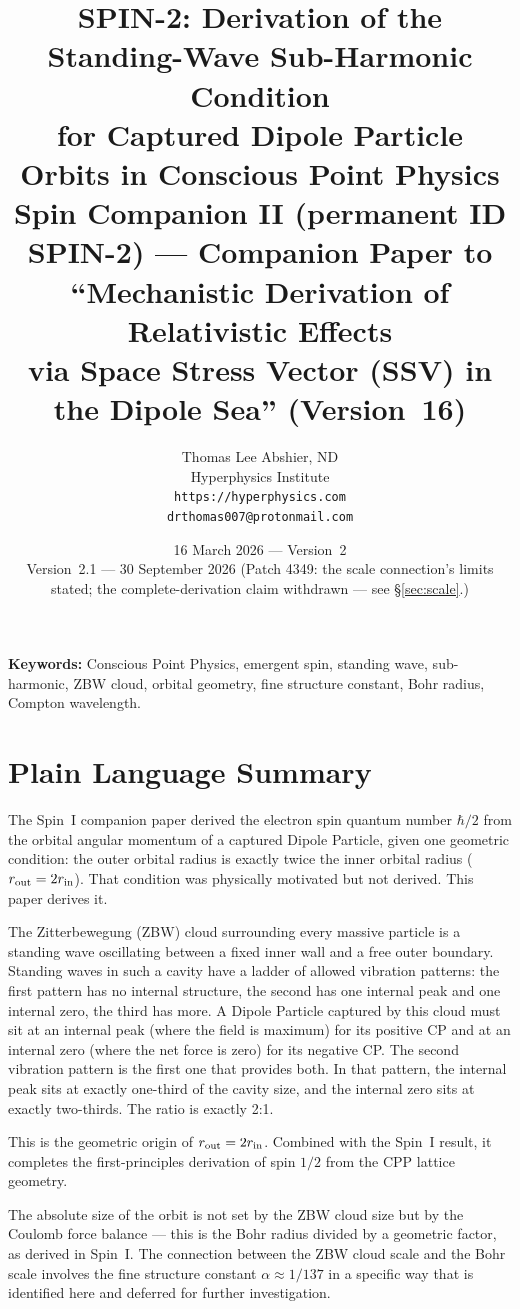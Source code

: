\documentclass[12pt]{article}
\title{\textbf{SPIN-2: Derivation of the Standing-Wave Sub-Harmonic Condition\\
for Captured Dipole Particle Orbits in Conscious Point Physics}\\[6pt]
{\large Spin Companion II (permanent ID SPIN-2) ---
Companion Paper to ``Mechanistic Derivation of Relativistic Effects\\
via Space Stress Vector (SSV) in the Dipole Sea'' (Version~16)}}
\author{Thomas Lee Abshier, ND\\
Hyperphysics Institute\\
\texttt{https://hyperphysics.com}\\
\texttt{drthomas007@protonmail.com}}
\date{16 March 2026 --- Version~2\\[2pt]
{\small Version~2.1 --- 30 September 2026 (Patch 4349: the scale connection's limits stated; the complete-derivation claim withdrawn --- see \S\ref{sec:scale}.)}}
\newcommand{\rin}{r_{\rm in}}
\newcommand{\rout}{r_{\rm out}}
\begin{document}
\maketitle

\noindent\textbf{Keywords:} Conscious Point Physics, emergent spin,
standing wave, sub-harmonic, ZBW cloud, orbital geometry, fine structure
constant, Bohr radius, Compton wavelength.

\section*{Plain Language Summary}

The Spin~I companion paper derived the electron spin quantum number
$\hbar/2$ from the orbital angular momentum of a captured Dipole
Particle, given one geometric condition: the outer orbital radius is
exactly twice the inner orbital radius ($\rout = 2\rin$).  That
condition was physically motivated but not derived.  This paper
derives it.

The Zitterbewegung (ZBW) cloud surrounding every massive particle is
a standing wave oscillating between a fixed inner wall and a free outer
boundary.  Standing waves in such a cavity have a ladder of allowed
vibration patterns: the first pattern has no internal structure, the
second has one internal peak and one internal zero, the third has more.
A Dipole Particle captured by this cloud must sit at an internal peak
(where the field is maximum) for its positive CP and at an internal
zero (where the net force is zero) for its negative CP.  The second
vibration pattern is the first one that provides both.  In that pattern,
the internal peak sits at exactly one-third of the cavity size, and the
internal zero sits at exactly two-thirds.  The ratio is exactly 2:1.

This is the geometric origin of $\rout = 2\rin$.  Combined with the
Spin~I result, it completes the first-principles derivation of spin
$1/2$ from the CPP lattice geometry.

The absolute size of the orbit is not set by the ZBW cloud size
but by the Coulomb force balance --- this is the Bohr radius divided
by a geometric factor, as derived in Spin~I.  The connection between
the ZBW cloud scale and the Bohr scale involves the fine structure
constant $\alpha \approx 1/137$ in a specific way that is identified
here and deferred for further investigation.
\end{document}
